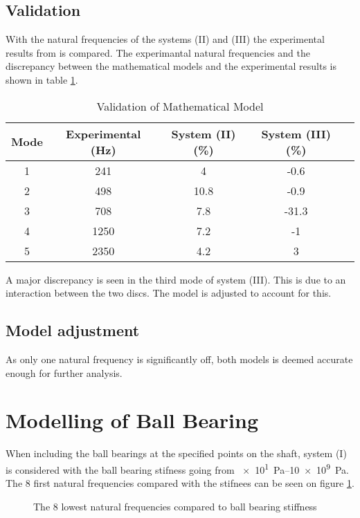 \subsection{Validation}
With the natural frequencies of the systems (II) and (III) the experimental results from \cite[6]{Problem} is compared. The experimantal natural frequencies and the discrepancy between the mathematical models and the experimental results is shown in table \ref{tab:validation_two_discs}.
\begin{table}[htbp]
    \begin{adjustwidth}{-1cm}{-1cm}
    \centering
    \caption{Validation of Mathematical Model}
    \label{tab:validation_two_discs}
    \begin{tabular}{@{}ccccc@{}}
        \toprule
        Mode    &   Experimental (\si{\hertz})    &   System (II) (\si{\percent})    &   System (III) (\si{\percent})  \\ \midrule
        1       &   241     &   4       &   -0.6    \\
        2       &   498     &   10.8    &   -0.9    \\
        3       &   708     &   7.8     &   -31.3   \\
        4       &   1250    &   7.2     &   -1      \\ 
        5       &   2350    &   4.2     &   3       \\ \bottomrule
    \end{tabular}
    \end{adjustwidth}
\end{table}

A major discrepancy is seen in the third mode of system (III). This is due to an interaction between the two discs. The model is adjusted to account for this.

\subsection{Model adjustment}
As only one natural frequency is significantly off, both models is deemed accurate enough for further analysis.


\section{Modelling of Ball Bearing}
When including the ball bearings at the specified points on the shaft, system (I) is considered with the ball bearing stifness going from \SIrange{e1}{10e9}{\pascal}.
The 8 first natural frequencies compared with the stifnees can be seen on figure \ref{fig:ball_bearing_stiffness}.
\begin{figure}[htbp]
    \centering
    
    \caption{The 8 lowest natural frequencies compared to ball bearing stiffness}
    \label{fig:ball_bearing_stiffness}
\end{figure}

